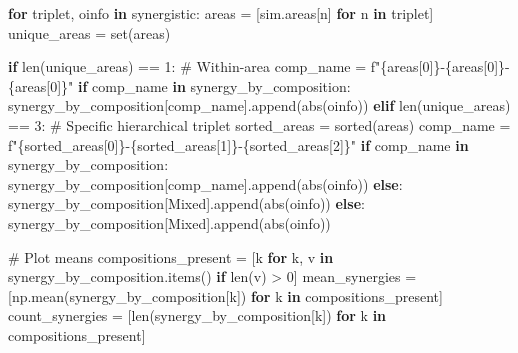 \documentclass[
  11pt,
  letterpaper,
  oneside,
  openany]{book}
\newenvironment{Shaded}{\begin{snugshade}}{\end{snugshade}}
\newcommand{\BuiltInTok}[1]{\textcolor[rgb]{0.00,0.23,0.31}{#1}}
\newcommand{\CommentTok}[1]{\textcolor[rgb]{0.37,0.37,0.37}{#1}}
\newcommand{\ControlFlowTok}[1]{\textcolor[rgb]{0.00,0.23,0.31}{\textbf{#1}}}
\newcommand{\DecValTok}[1]{\textcolor[rgb]{0.68,0.00,0.00}{#1}}
\newcommand{\KeywordTok}[1]{\textcolor[rgb]{0.00,0.23,0.31}{\textbf{#1}}}
\newcommand{\NormalTok}[1]{\textcolor[rgb]{0.00,0.23,0.31}{#1}}
\newcommand{\OperatorTok}[1]{\textcolor[rgb]{0.37,0.37,0.37}{#1}}
\newcommand{\SpecialCharTok}[1]{\textcolor[rgb]{0.37,0.37,0.37}{#1}}
\newcommand{\SpecialStringTok}[1]{\textcolor[rgb]{0.13,0.47,0.30}{#1}}
\newcommand{\StringTok}[1]{\textcolor[rgb]{0.13,0.47,0.30}{#1}}
\begin{document}
\begin{Shaded}
\begin{Highlighting}[]
\ControlFlowTok{for}\NormalTok{ triplet, oinfo }\KeywordTok{in}\NormalTok{ synergistic:}
\NormalTok{    areas }\OperatorTok{=}\NormalTok{ [sim.areas[n] }\ControlFlowTok{for}\NormalTok{ n }\KeywordTok{in}\NormalTok{ triplet]}
\NormalTok{    unique\_areas }\OperatorTok{=} \BuiltInTok{set}\NormalTok{(areas)}
    
    \ControlFlowTok{if} \BuiltInTok{len}\NormalTok{(unique\_areas) }\OperatorTok{==} \DecValTok{1}\NormalTok{:}
        \CommentTok{\# Within{-}area}
\NormalTok{        comp\_name }\OperatorTok{=} \SpecialStringTok{f"}\SpecialCharTok{\{}\NormalTok{areas[}\DecValTok{0}\NormalTok{]}\SpecialCharTok{\}}\SpecialStringTok{{-}}\SpecialCharTok{\{}\NormalTok{areas[}\DecValTok{0}\NormalTok{]}\SpecialCharTok{\}}\SpecialStringTok{{-}}\SpecialCharTok{\{}\NormalTok{areas[}\DecValTok{0}\NormalTok{]}\SpecialCharTok{\}}\SpecialStringTok{"}
        \ControlFlowTok{if}\NormalTok{ comp\_name }\KeywordTok{in}\NormalTok{ synergy\_by\_composition:}
\NormalTok{            synergy\_by\_composition[comp\_name].append(}\BuiltInTok{abs}\NormalTok{(oinfo))}
    \ControlFlowTok{elif} \BuiltInTok{len}\NormalTok{(unique\_areas) }\OperatorTok{==} \DecValTok{3}\NormalTok{:}
        \CommentTok{\# Specific hierarchical triplet}
\NormalTok{        sorted\_areas }\OperatorTok{=} \BuiltInTok{sorted}\NormalTok{(areas)}
\NormalTok{        comp\_name }\OperatorTok{=} \SpecialStringTok{f"}\SpecialCharTok{\{}\NormalTok{sorted\_areas[}\DecValTok{0}\NormalTok{]}\SpecialCharTok{\}}\SpecialStringTok{{-}}\SpecialCharTok{\{}\NormalTok{sorted\_areas[}\DecValTok{1}\NormalTok{]}\SpecialCharTok{\}}\SpecialStringTok{{-}}\SpecialCharTok{\{}\NormalTok{sorted\_areas[}\DecValTok{2}\NormalTok{]}\SpecialCharTok{\}}\SpecialStringTok{"}
        \ControlFlowTok{if}\NormalTok{ comp\_name }\KeywordTok{in}\NormalTok{ synergy\_by\_composition:}
\NormalTok{            synergy\_by\_composition[comp\_name].append(}\BuiltInTok{abs}\NormalTok{(oinfo))}
        \ControlFlowTok{else}\NormalTok{:}
\NormalTok{            synergy\_by\_composition[}\StringTok{\textquotesingle{}Mixed\textquotesingle{}}\NormalTok{].append(}\BuiltInTok{abs}\NormalTok{(oinfo))}
    \ControlFlowTok{else}\NormalTok{:}
\NormalTok{        synergy\_by\_composition[}\StringTok{\textquotesingle{}Mixed\textquotesingle{}}\NormalTok{].append(}\BuiltInTok{abs}\NormalTok{(oinfo))}

\CommentTok{\# Plot means}
\NormalTok{compositions\_present }\OperatorTok{=}\NormalTok{ [k }\ControlFlowTok{for}\NormalTok{ k, v }\KeywordTok{in}\NormalTok{ synergy\_by\_composition.items() }\ControlFlowTok{if} \BuiltInTok{len}\NormalTok{(v) }\OperatorTok{\textgreater{}} \DecValTok{0}\NormalTok{]}
\NormalTok{mean\_synergies }\OperatorTok{=}\NormalTok{ [np.mean(synergy\_by\_composition[k]) }\ControlFlowTok{for}\NormalTok{ k }\KeywordTok{in}\NormalTok{ compositions\_present]}
\NormalTok{count\_synergies }\OperatorTok{=}\NormalTok{ [}\BuiltInTok{len}\NormalTok{(synergy\_by\_composition[k]) }\ControlFlowTok{for}\NormalTok{ k }\KeywordTok{in}\NormalTok{ compositions\_present]}


\end{Highlighting}
\end{Shaded}
\end{document}
